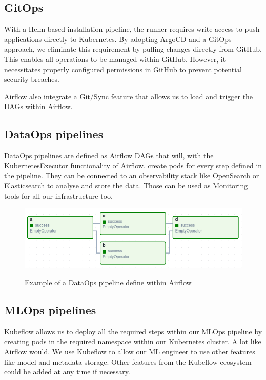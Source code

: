 \subsection{GitOps}\label{subsec:gitops2}
With a Helm-based installation pipeline, the runner requires write access to push applications directly to Kubernetes.
By adopting ArgoCD and a GitOps approach, we eliminate this requirement by pulling changes directly from GitHub.
This enables all operations to be managed within GitHub.
However, it necessitates properly configured permissions in GitHub to prevent potential security breaches.

Airflow also integrate a Git/Sync feature that allows us to load and trigger the DAGs within Airflow.

\subsection{DataOps pipelines}\label{subsec:dataops-pipelines2}
DataOps pipelines are defined as Airflow DAGs that will, with the KubernetesExecutor functionality of Airflow,
create pods for every step defined in the pipeline.
They can be connected to an observability stack like OpenSearch or Elasticsearch to analyse and store the data.
Those can be used as Monitoring tools for all our infrastructure too.

\begin{figure}[!htbp]
    \centering
    \caption{Example of a DataOps pipeline define within Airflow}
    \includegraphics[scale=0.5]{images/project/data-ops-airflow-dag}
    \label{fig:project-data-ops-airflow-dag}
\end{figure}

\subsection{MLOps pipelines}\label{subsec:mlops-pipelines2}
Kubeflow allows us to deploy all the required steps within our MLOps pipeline by creating pods in the required namespace within our Kubernetes cluster.
A lot like Airflow would.
We use Kubeflow to allow our ML engineer to use other features like model and metadata storage.
Other features from the Kubeflow ecosystem could be added at any time if necessary.


